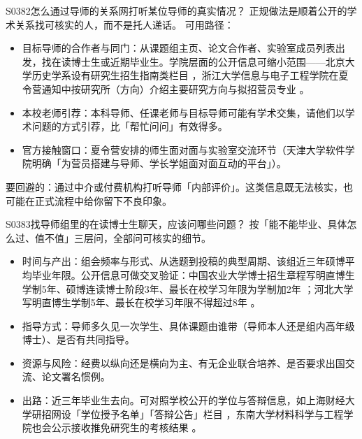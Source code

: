 \begin{qa}{S0382}{怎么通过导师的关系网打听某位导师的真实情况？}
正规做法是顺着公开的学术关系找可核实的人，而不是托人递话。
可用路径：
\begin{itemize}
  \item 目标导师的合作者与同门：从课题组主页、论文合作者、实验室成员列表出发，找在读博士生或近期毕业生。学院层面的公开信息可缩小范围——北京大学历史学系设有研究生招生指南类栏目 ，浙江大学信息与电子工程学院在夏令营通知中按研究所（方向）介绍主要研究方向与拟招营员专业 。
  \item 本校老师引荐：本科导师、任课老师与目标导师可能有学术交集，请他们以学术问题的方式引荐，比「帮忙问问」有效得多。
  \item 官方接触窗口：夏令营安排的师生面对面与实验室交流环节（天津大学软件学院明确「为营员搭建与导师、学长学姐面对面互动的平台」）。
\end{itemize}
要回避的：通过中介或付费机构打听导师「内部评价」。这类信息既无法核实，也可能在正式流程中给你留下不良印象。
\end{qa}

\begin{qa}{S0383}{找导师组里的在读博士生聊天，应该问哪些问题？}
按「能不能毕业、具体怎么过、值不值」三层问，全部问可核实的细节。
\begin{itemize}
  \item 时间与产出：组会频率与形式、从选题到投稿的典型周期、该组近三年硕博平均毕业年限。公开信息可做交叉验证：中国农业大学博士招生章程写明直博生学制5年、硕博连读博士阶段3年、最长在校学习年限为学制加2年 ；河北大学写明直博生学制5年、最长在校学习年限不得超过8年 。
  \item 指导方式：导师多久见一次学生、具体课题由谁带（导师本人还是组内高年级博士）、是否有共同指导。
  \item 资源与风险：经费以纵向还是横向为主、有无企业联合培养、是否要求出国交流、论文署名惯例。
  \item 出路：近三年毕业生去向。可对照学校公开的学位与答辩信息，如上海财经大学研招网设「学位授予名单」「答辩公告」栏目 ，东南大学材料科学与工程学院也会公示接收推免研究生的考核结果 。
\end{itemize}
\end{qa}

